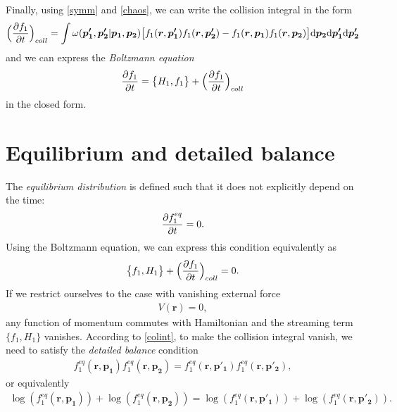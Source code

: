 Finally, using \ref{symm} and \ref{chaos}, we can write the collision integral in the form
\begin{align} \label{colint}
\Big( \frac{\partial f_1}{\partial t} \Big)_{coll}= \int \omega(\bm{p'_1},\bm{p'_2} | \bm{p_1}, \bm{p_2}) \big[f_1(\bm{r},\bm{p'_1})f_1(\bm{r},\bm{p'_2}) - f_1(\bm{r},\bm{p_1})f_1(\bm{r},\bm{p_2}) \big] \mathrm{d} \bm{p_2} \mathrm{d} \bm{p'_1} \mathrm{d} \bm{p'_2}
\end{align}
and we can express the \textit{Boltzmann equation}
\begin{align} \label{Boltz}
\frac{\partial f_1}{\partial t}  = \big\{ H_1, f_1 \big\} + \Big(\frac{\partial f_1}{\partial t} \Big)_{coll}
\end{align}
in the closed form.

\section{Equilibrium and detailed balance}
The \textit{equilibrium distribution} is defined such that it does not explicitly depend on the time:
\begin{align*}
\frac{\partial f_1^{eq}}{\partial t} = 0.
\end{align*}
Using the Boltzmann equation, we can express this condition equivalently as
\begin{align*}
\big\{ f_1, H_1 \big\} + \Big( \frac{\partial f_1}{\partial t} \Big)_{coll} = 0.
\end{align*}
If we restrict ourselves to the case with vanishing external force
\begin{align*}
V(\bm{r}) = 0,
\end{align*}
any function of momentum commutes with Hamiltonian and the streaming term $\big\{ f_1, H_1 \big\}$ vanishes.
According to \ref{colint}, to make the collision integral vanish, we need to satisfy the \textit{detailed balance} condition
\begin{align} \label{detailedbalance}
f_1^{eq}(\bm{r},\bm{p_1})f_1^{eq}(\bm{r},\bm{p_2}) = f_1^{eq}(\bm{r},\bm{p'_1})f_1^{eq}(\bm{r},\bm{p'_2}),
\end{align}
or equivalently
\begin{align*}
\log(f_1^{eq}(\bm{r},\bm{p_1})) + \log(f_1^{eq}(\bm{r},\bm{p_2})) = \log(f_1^{eq}(\bm{r},\bm{p'_1})) + \log(f_1^{eq}(\bm{r},\bm{p'_2})).
\end{align*}

